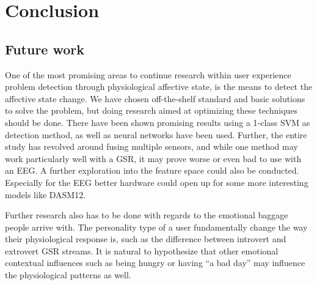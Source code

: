 
\section{Conclusion}

\subsection{Future work}
One of the most promising areas to continue research within user experience problem detection through physiological affective state, is the means to detect the affective state change. 
We have chosen off-the-shelf standard and basic solutions to solve the problem, but doing research aimed at optimizing these techniques should be done. 
There have been shown promising results using a 1-class SVM as detection method, as well as neural networks have been used.
Further, the entire study has revolved around fusing multiple sensors, and while one method may work particularly well with a GSR, it may prove worse or even bad to use with an EEG. 
A further exploration into the feature space could also be conducted. 
Especially for the EEG better hardware could open up for some more interesting models like DASM12\cite{eeg_music_listening}. 

Further research also has to be done with regards to the emotional baggage people arrive with. 
The personality type of a user fundamentally change the way their physiological response is, such as the difference between introvert and extrovert GSR streams. 
It is natural to hypothesize that other emotional contextual influences such as being hungry or having ``a bad day'' may influence the physiological patterns as well. 

